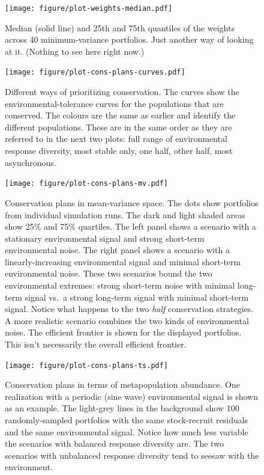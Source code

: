 \documentclass[12pt]{article}
\begin{document}
\begin{figure}[htbp]
\centering
\texttt{[image: figure/plot-weights-median.pdf]}
\caption{Median (solid line) and 25th and 75th quantiles of the weights
across 40 minimum-variance portfolios. Just another way of looking at
it. (Nothing to see here right now.)}
\end{figure}

\begin{figure}[htbp]
\centering
\texttt{[image: figure/plot-cons-plans-curves.pdf]}
\caption{Different ways of prioritizing conservation. The curves show
the environmental-tolerance curves for the populations that are
conserved. The colours are the same as earlier and identify the
different populations. These are in the same order as they are referred
to in the next two plots: full range of environmental response
diversity, most stable only, one half, other half, most asynchronous.}
\end{figure}

\begin{figure}[htbp]
\centering
\texttt{[image: figure/plot-cons-plans-mv.pdf]}
\caption{Conservation plans in mean-variance space. The dots show
portfolios from individual simulation runs. The dark and light shaded
areas show 25\% and 75\% quartiles. The left panel shows a scenario with
a stationary environmental signal and strong short-term environmental
noise. The right panel shows a scenario with a linearly-increasing
environmental signal and minimal short-term environmental noise. These
two scenarios bound the two environmental extremes: strong short-term
noise with minimal long-term signal vs.~a strong long-term signal with
minimal short-term signal. Notice what happens to the two \emph{half}
conservation strategies. A more realistic scenario combines the two
kinds of environmental noise. The efficient frontier is shown for the
displayed portfolios. This isn't necessarily the overall efficient
frontier.}
\end{figure}

\begin{figure}[htbp]
\centering
\texttt{[image: figure/plot-cons-plans-ts.pdf]}
\caption{Conservation plans in terms of metapopulation abundance. One
realization with a periodic (sine wave) environmental signal is shown as
an example. The light-grey lines in the background show 100
randomly-sampled portfolios with the same stock-recruit residuals and
the same environmental signal. Notice how much less variable the
scenarios with balanced response diversity are. The two scenarios with
unbalanced response diversity tend to seesaw with the environment.}
\end{figure}
\end{document}
